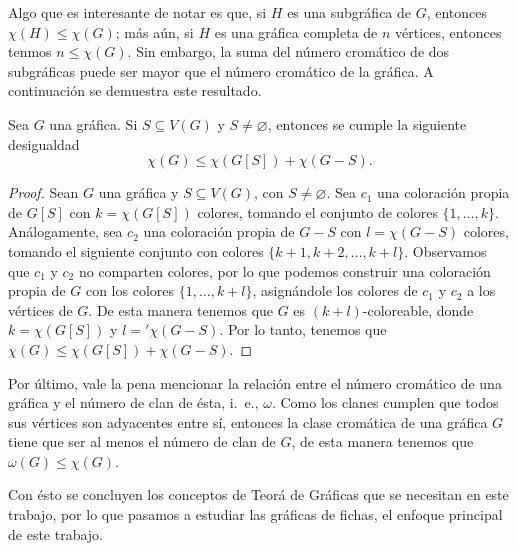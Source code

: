 Algo que es interesante de notar es que, si $H$ es una subgr\'afica de $G$,
entonces $\chi(H) \leq \chi(G)$; m\'as a\'un, si $H$ es una gr\'afica completa
de $n$ v\'ertices, entonces tenmos $n \leq \chi(G)$. Sin embargo, la suma del
n\'umero crom\'atico de dos subgr\'aficas puede ser mayor que el n\'umero
crom\'atico de la gr\'afica. A continuaci\'on se demuestra este resultado.

\begin{proposicion}
    Sea $G$ una gr\'afica.   Si $S \subseteq V(G)$ y $S \neq \varnothing$,
    entonces se cumple la siguiente desigualdad
    \[
        \chi(G) \leq \chi(G[S])+\chi(G-S).
    \] 
\end{proposicion}

\begin{proof}
    Sean $G$ una gr\'afica y $S \subseteq V(G)$, con $S \neq \varnothing$.  Sea
    $c_1$ una coloraci\'on propia de $G[S]$ con $ k= \chi(G[S])$ colores,
    tomando el conjunto de colores $\{1, \dots, k\}$. An\'alogamente, sea $c_2$
    una coloraci\'on propia de $G-S$ con $l= \chi(G-S)$ colores, tomando el
    siguiente conjunto con colores $\{k+1, k+2, \dots, k+l\}$. Observamos que
    $c_1$ y $c_2$ no comparten colores, por lo que podemos construir una
    coloraci\'on propia de $G$ con los colores $\{1, \dots, k+l\}$,
    asign\'andole los colores de $c_1$ y $c_2$ a los v\'ertices de $G$. De esta
    manera tenemos que $G$ es $(k+l)$-coloreable, donde $k = \chi(G[S])$ y $l =
    '\chi(G-S)$. Por lo tanto, tenemos que $\chi(G) \leq \chi(G[S])+\chi(G-S)$.
\end{proof}

Por \'ultimo, vale la pena mencionar la relaci\'on entre el n\'umero crom\'atico
de una gr\'afica y el n\'umero de clan de \'esta, i.~e., $\omega$. Como los
clanes cumplen que todos sus v\'ertices son adyacentes entre s\'i, entonces la
clase crom\'atica de una gr\'afica $G$ tiene que ser al menos el n\'umero de
clan de $G$, de esta manera tenemos que $\omega(G) \leq \chi(G)$. 

Con \'esto se concluyen los conceptos de Teor\'a de Gr\'aficas que se necesitan
en este trabajo, por lo que pasamos a estudiar las gr\'aficas de fichas, el
enfoque principal de este trabajo.
